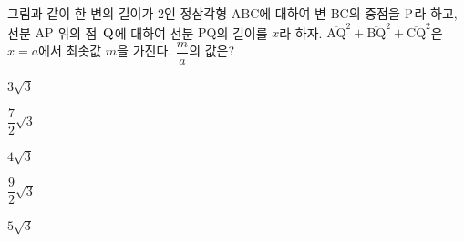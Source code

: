 \noindent\begin{minipage}[t]{0.58\linewidth}\vspace{0pt}\raggedright 그림과 같이 한 변의 길이가 $2$인 정삼각형 $\mathrm{ABC}$에 대하여 변 $\mathrm{BC}$의 중점을 $\mathrm{P}$라 하고, 선분 $\mathrm{AP}$ 위의 점~$\mathrm{Q}$에 대하여 선분 $\mathrm{PQ}$의 길이를 $x$라 하자. $\overline{\mathrm{AQ}}^2+\overline{\mathrm{BQ}}^2+\overline{\mathrm{CQ}}^2$은 $x=a$에서 최솟값 $m$을 가진다. $\dfrac{m}{a}$의 값은? \end{minipage}\hfill\begin{minipage}[t]{0.4\linewidth}\vspace{0pt}\centering \resizebox{\ifdim\width>\linewidth\linewidth\else\width\fi}{!}{}\end{minipage}\par
\begin{choices32}{\rule[-3ex]{0pt}{8ex}$3\sqrt{3}$}{\rule[-3ex]{0pt}{8ex}$\dfrac{7}{2}\sqrt{3}$}{\rule[-3ex]{0pt}{8ex}$4\sqrt{3}$}{\rule[-3ex]{0pt}{8ex}$\dfrac{9}{2}\sqrt{3}$}{\rule[-3ex]{0pt}{8ex}$5\sqrt{3}$}\end{choices32}
